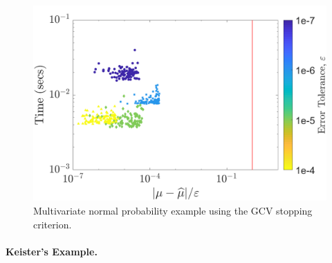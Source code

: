 \documentclass[twocolumn]{svjour3}          %
\begin{document}
\begin{figure}
	\centering
	\includegraphics[width=0.95\linewidth]{"MVN_guaranteed_time_GCV_C2sin_d2_r2_2018-Sep-6"}
	\caption[MVN guaranteed : GCV]{Multivariate normal probability example using the GCV stopping criterion.}
	\label{fig:mvn-guaranteed-GCV}
\end{figure}

\paragraph{Keister's Example.}
\end{document}
